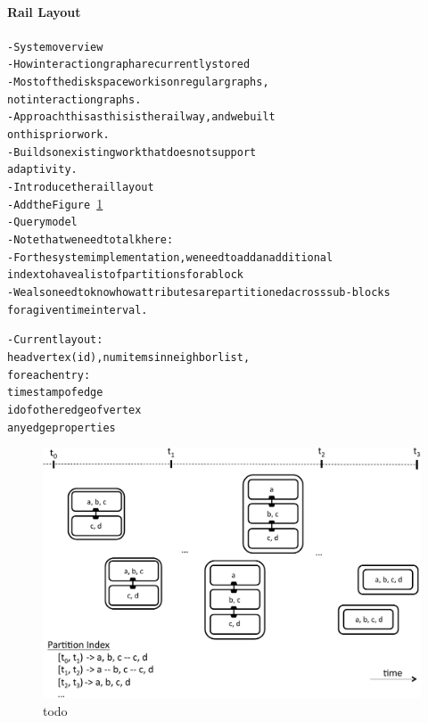 \paragraph*{Rail Layout}
%




\begin{alltt}\scriptsize
- System overview
    - How interaction graph are currently stored
        - Most of the disk space work is on regular graphs, 
           not interaction graphs. 
        - Approach this as this is the railway, and we built
           on this prior work.
        - Builds on existing work that does not support 
          adaptivity.
    - Introduce the rail layout
    - Add the Figure~\ref{fig:rail_layout}
    - Query model
   - Note that we need to talk here:
    - For the system implementation, we need to add an additional
       index to have a list of partitions for a block
   - We also need to know how attributes are partitioned across sub-blocks 
      for a given time interval.

    - Current layout:
    head vertex (id), num items in neighbor list, 
    for each entry:
        timestamp of edge
        id of other edge of vertex
        any edge properties

\end{alltt}

\begin{figure}[ht]
\includegraphics[width=0.9\columnwidth]{figures/rail_layout.pdf} 
 \caption{todo}
 \label{fig:rail_layout}
 \end{figure}
